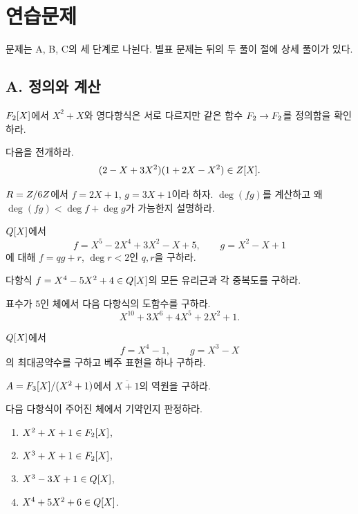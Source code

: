 \section{연습문제}
\label{sec:polynomial-exercises}

문제는 A, B, C의 세 단계로 나뉜다. 별표 문제는 뒤의 두 풀이 절에 상세 풀이가 있다.

\subsection*{A. 정의와 계산}

\begin{exercise}
$F_2[X]$에서 $X^2+X$와 영다항식은 서로 다르지만 같은 함수 $F_2\to F_2$를 정의함을 확인하라.
\end{exercise}

\begin{exercise}
다음을 전개하라.
\[
 (2-X+3X^2)(1+2X-X^2)\in Z[X].
\]
\end{exercise}

\begin{exercise}
$R=Z/6Z$에서 $f=2X+1$, $g=3X+1$이라 하자. $\deg(fg)$를 계산하고 왜 $\deg(fg)<\deg f+\deg g$가 가능한지 설명하라.
\end{exercise}

\begin{exercise}[*]
$Q[X]$에서
\[
 f=X^5-2X^4+3X^2-X+5,\qquad g=X^2-X+1
\]
에 대해 $f=qg+r$, $\deg r<2$인 $q,r$을 구하라.
\end{exercise}

\begin{exercise}
다항식 $f=X^4-5X^2+4\in Q[X]$의 모든 유리근과 각 중복도를 구하라.
\end{exercise}

\begin{exercise}
표수가 $5$인 체에서 다음 다항식의 도함수를 구하라.
\[
 X^{10}+3X^6+4X^5+2X^2+1.
\]
\end{exercise}

\begin{exercise}[*]
$Q[X]$에서
\[
 f=X^4-1,\qquad g=X^3-X
\]
의 최대공약수를 구하고 베주 표현을 하나 구하라.
\end{exercise}

\begin{exercise}[*]
$A=F_3[X]/(X^2+1)$에서 $\overline{X+1}$의 역원을 구하라.
\end{exercise}

\begin{exercise}
다음 다항식이 주어진 체에서 기약인지 판정하라.
\begin{enumerate}[label=(\alph*)]
  \item $X^2+X+1\in F_2[X]$,
  \item $X^3+X+1\in F_2[X]$,
  \item $X^3-3X+1\in Q[X]$,
  \item $X^4+5X^2+6\in Q[X]$.
\end{enumerate}
\end{exercise}


